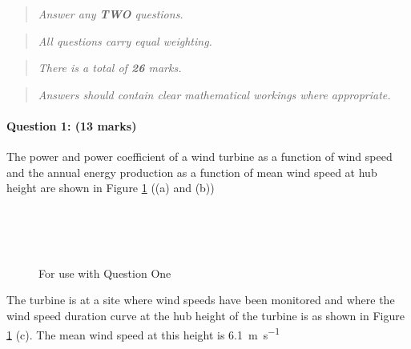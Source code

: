 \documentclass[a4paper,12pt,fleqn]{article}
\begin{document}
\newpage

\begin{quote}
    \begin{center}
        \textit{Answer any \textbf{TWO} questions.}
    \end{center}
\end{quote}

\begin{quote}
    \begin{center}
        \textit{All questions carry equal weighting.}
    \end{center}
\end{quote}

\begin{quote}
    \begin{center}
        \textit{There is a total of \textbf{26} marks.}
    \end{center}
\end{quote}

\begin{quote}
    \begin{center}
        \textit{Answers should contain clear mathematical workings where appropriate.}
    \end{center}
\end{quote}

\newpage


\paragraph{\textbf{Question 1: (13 marks)}}


The power and power coefficient of a wind turbine as a function of wind speed and the annual energy production as a function of mean wind
speed at hub height are shown in Figure \ref{figure:q1} ((a) and (b))

\begin{figure}
    \\
     \\
     \\
    \caption{For use with Question One}

\label{figure:q1}
\end{figure}
\newline
The turbine is at a site where wind speeds have been monitored and where the wind speed duration curve at the hub height of the turbine is as shown in 
Figure \ref{figure:q1} (c). 
The mean wind speed at this height is \SI{6.1}{\metre\per\second}
\end{document}
